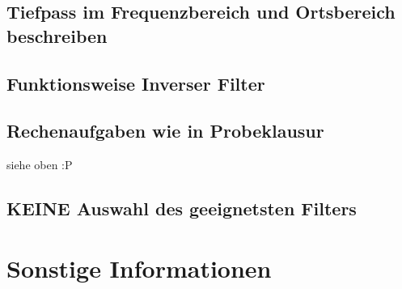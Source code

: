 \documentclass[pdftex,oneside,12pt,parskip=half,abstracton,ngerman]{scrartcl}
\begin{document}
\subsection{Tiefpass im Frequenzbereich und Ortsbereich beschreiben}
\subsection{Funktionsweise Inverser Filter}
\subsection{Rechenaufgaben wie in Probeklausur}
siehe oben :P
\subsection{KEINE Auswahl des geeignetsten Filters}

\section{Sonstige Informationen}
        
        
        
        



\end{document}

